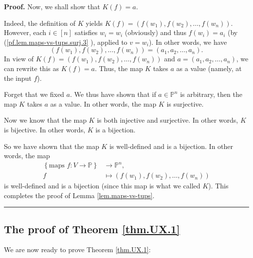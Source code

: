 \documentclass[numbers=enddot,12pt,final,onecolumn,notitlepage]{scrartcl}%
\numberwithin{exer}{section}
\theoremstyle{definition}
\newenvironment{proof}[1][Proof]{\noindent\textbf{#1.} }{\ \rule{0.5em}{0.5em}}
\newenvironment{verlong}{}{}
\begin{document}
\begin{verlong}
\begin{proof}
Now, we shall show that $K\left(  f\right)  =a$.

Indeed, the definition of $K$ yields $K\left(  f\right)  =\left(  f\left(
w_{1}\right)  ,f\left(  w_{2}\right)  ,\ldots,f\left(  w_{n}\right)  \right)
$. However, each $i\in\left[  n\right]  $ satisfies $w_{i}=w_{i}$ (obviously)
and thus $f\left(  w_{i}\right)  =a_{i}$ (by (\ref{pf.lem.maps-vs-tups.surj.3}%
), applied to $v=w_{i}$). In other words, we have%
\[
\left(  f\left(  w_{1}\right)  ,f\left(  w_{2}\right)  ,\ldots,f\left(
w_{n}\right)  \right)  =\left(  a_{1},a_{2},\ldots,a_{n}\right)  .
\]
In view of $K\left(  f\right)  =\left(  f\left(  w_{1}\right)  ,f\left(
w_{2}\right)  ,\ldots,f\left(  w_{n}\right)  \right)  $ and $a=\left(
a_{1},a_{2},\ldots,a_{n}\right)  $, we can rewrite this as $K\left(  f\right)
=a$. Thus, the map $K$ takes $a$ as a value (namely, at the input $f$).

Forget that we fixed $a$. We thus have shown that if $a\in\mathbb{P}^{n}$ is
arbitrary, then the map $K$ takes $a$ as a value. In other words, the map $K$
is surjective.

Now we know that the map $K$ is both injective and surjective. In other words,
$K$ is bijective. In other words, $K$ is a bijection.

So we have shown that the map $K$ is well-defined and is a bijection. In other
words, the map%
\begin{align*}
\left\{  \text{maps }f:V\rightarrow\mathbb{P}\right\}   &  \rightarrow
\mathbb{P}^{n},\\
f  &  \mapsto\left(  f\left(  w_{1}\right)  ,f\left(  w_{2}\right)
,\ldots,f\left(  w_{n}\right)  \right)
\end{align*}
is well-defined and is a bijection (since this map is what we called $K$).
This completes the proof of Lemma \ref{lem.maps-vs-tups}.
\end{proof}
\end{verlong}

\subsection{The proof of Theorem \ref{thm.UX.1}}

We are now ready to prove Theorem \ref{thm.UX.1}:
\end{document}
